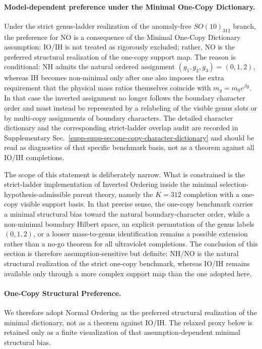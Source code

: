\documentclass[11pt]{article}
\begin{document}
\paragraph{Model-dependent preference under the Minimal One-Copy Dictionary.}
Under the strict genus-ladder realization of the anomaly-free $SO(10)_{312}$ branch, the preference for NO is a consequence of the Minimal One-Copy Dictionary assumption: IO/IH is not treated as rigorously excluded; rather, NO is the preferred structural realization of the one-copy support map. The reason is conditional: NH admits the natural ordered assignment $(g_1,g_2,g_3)=(0,1,2)$, whereas IH becomes non-minimal only after one also imposes the extra requirement that the physical mass ratios themselves coincide with $m_g=m_0e^{\beta g}$. In that case the inverted assignment no longer follows the boundary character order and must instead be represented by a relabeling of the visible genus slots or by multi-copy assignments of boundary characters. The detailed character dictionary and the corresponding strict-ladder overlap audit are recorded in Supplementary Sec.~\ref{supp-supp-sec:one-copy-character-dictionary} and should be read as diagnostics of that specific benchmark basis, not as a theorem against all IO/IH completions.

The scope of this statement is deliberately narrow. What is constrained is the strict-ladder implementation of Inverted Ordering inside the minimal selection-hypothesis-admissible parent theory, namely the $K=312$ completion with a one-copy visible support basis. In that precise sense, the one-copy benchmark carries a minimal structural bias toward the natural boundary-character order, while a non-minimal boundary Hilbert space, an explicit permutation of the genus labels $(0,1,2)$, or a looser mass-to-genus identification remains a possible extension rather than a no-go theorem for all ultraviolet completions. The conclusion of this section is therefore assumption-sensitive but definite: NH/NO is the natural structural realization of the strict one-copy benchmark, whereas IO/IH remains available only through a more complex support map than the one adopted here.

\paragraph{One-Copy Structural Preference.}
We therefore adopt Normal Ordering as the preferred structural realization of the minimal dictionary, not as a theorem against IO/IH. The relaxed proxy below is retained only as a finite visualization of that assumption-dependent minimal structural bias.
\end{document}
